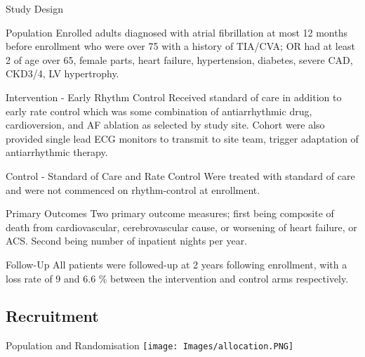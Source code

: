 \documentclass[UKenglish]{beamer}
\begin{document}
\begin{frame}[allowframebreaks]{Study Design}
   
    
    \begin{alertblock}{Population}
        Enrolled adults diagnosed with atrial fibrillation at most 12 months before enrollment who were over 75 with a history of TIA/CVA; OR had at least 2 of age over 65, female parts, heart failure, hypertension, diabetes, severe CAD, CKD3/4, LV hypertrophy.
    \end{alertblock}
    
    \begin{alertblock}{Intervention - Early Rhythm Control}
        Received standard of care in addition to early rate control which was some combination of antiarrhythmic drug, cardioversion, and AF ablation as selected by study site. Cohort were also provided single lead ECG monitors to transmit to site team, trigger adaptation of antiarrhythmic therapy.
    \end{alertblock}
    
    \begin{alertblock}{Control - Standard of Care and Rate Control}
        Were treated with standard of care and were not commenced on rhythm-control at enrollment.
    \end{alertblock}
    
    \begin{alertblock}{Primary Outcomes}
        Two primary outcome measures; first being composite of death from cardiovascular, cerebrovascular cause, or worsening of heart failure, or ACS. Second being number of inpatient nights per year.
    \end{alertblock}
    
        
    \begin{alertblock}{Follow-Up}
        All patients were followed-up at 2 years following enrollment, with a loss rate of 9 and 6.6 \% between the intervention and control arms respectively.
    \end{alertblock}
    
\end{frame}

\subsection{Recruitment}

\begin{frame}{Population and Randomisation}
    \texttt{[image: Images/allocation.PNG]}

\end{frame}
\end{document}
